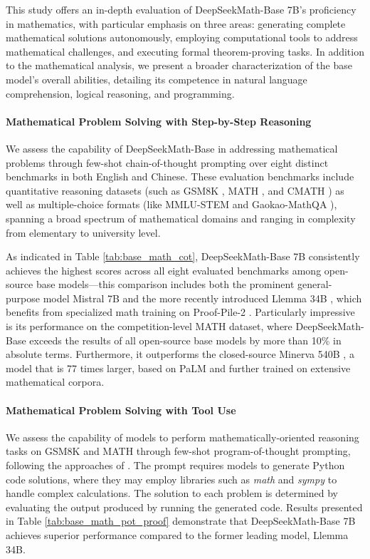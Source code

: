 \begin{itemize}[topsep=0pt]
This study offers an in-depth evaluation of DeepSeekMath-Base 7B’s proficiency in mathematics, with particular emphasis on three areas: generating complete mathematical solutions autonomously, employing computational tools to address mathematical challenges, and executing formal theorem-proving tasks. In addition to the mathematical analysis, we present a broader characterization of the base model’s overall abilities, detailing its competence in natural language comprehension, logical reasoning, and programming.

\paragraph{Mathematical Problem Solving with Step-by-Step Reasoning}

We assess the capability of DeepSeekMath-Base in addressing mathematical problems through few-shot chain-of-thought prompting \citep{cot} over eight distinct benchmarks in both English and Chinese. These evaluation benchmarks include quantitative reasoning datasets (such as GSM8K \citep{gsm8k}, MATH \citep{MATH}, and CMATH \citep{wei2023cmath}) as well as multiple-choice formats (like MMLU-STEM \citep{mmlu} and Gaokao-MathQA \citep{agieval}), spanning a broad spectrum of mathematical domains and ranging in complexity from elementary to university level.

As indicated in Table \ref{tab:base_math_cot}, DeepSeekMath-Base 7B consistently achieves the highest scores across all eight evaluated benchmarks among open-source base models—this comparison includes both the prominent general-purpose model Mistral 7B \citep{mistral} and the more recently introduced Llemma 34B \citep{llemma}, which benefits from specialized math training on Proof-Pile-2 \citep{llemma}. Particularly impressive is its performance on the competition-level MATH dataset, where DeepSeekMath-Base exceeds the results of all open-source base models by more than 10\% in absolute terms. Furthermore, it outperforms the closed-source Minerva 540B \citep{minerva}, a model that is 77 times larger, based on PaLM \citep{palm} and further trained on extensive mathematical corpora.

\paragraph{Mathematical Problem Solving with Tool Use} We assess the capability of models to perform mathematically-oriented reasoning tasks on GSM8K and MATH through few-shot program-of-thought prompting, following the approaches of \citet{pot,pal}. The prompt requires models to generate Python code solutions, where they may employ libraries such as \textit{math} and \textit{sympy} to handle complex calculations. The solution to each problem is determined by evaluating the output produced by running the generated code. Results presented in Table \ref{tab:base_math_pot_proof} demonstrate that DeepSeekMath-Base 7B achieves superior performance compared to the former leading model, Llemma 34B.


\end{itemize}
